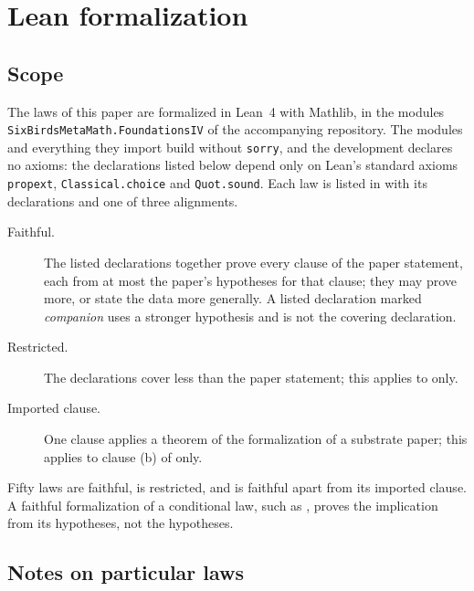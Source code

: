 \section{Lean formalization}\label{app:formalization}

\subsection{Scope}\label{subsec:lean-wording-discipline}

The laws of this paper are formalized in Lean~4 with Mathlib, in the
modules \texttt{SixBirdsMetaMath.FoundationsIV} of the accompanying
repository.  The modules and everything they import build without
\texttt{sorry}, and the development declares no axioms: the declarations
listed below depend only on Lean's standard axioms \texttt{propext},
\texttt{Classical.choice} and \texttt{Quot.sound}.  Each law is listed
in  with its declarations and one of
three alignments.
\begin{description}
\item[Faithful.] The listed declarations together prove every clause of
  the paper statement, each from at most the paper's hypotheses for that
  clause; they may prove more, or state the data more generally.  A
  listed declaration marked \emph{companion} uses a stronger hypothesis
  and is not the covering declaration.
\item[Restricted.] The declarations cover less than the paper
  statement; this applies to  only.
\item[Imported clause.] One clause applies a theorem of the
  formalization of a substrate paper; this applies to clause (b) of
   only.
\end{description}
Fifty laws are faithful,  is restricted, and  is
faithful apart from its imported clause.  A faithful formalization of a
conditional law, such as , proves the implication from its
hypotheses, not the hypotheses.

\subsection{Notes on particular laws}\label{subsec:narrowing-disclosure}

